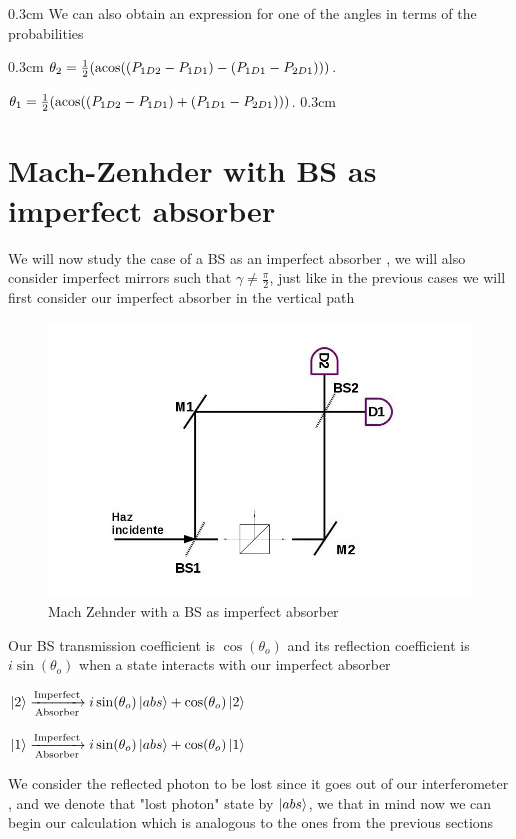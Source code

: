 \documentclass[11pt]{article}
\begin{document}
\vspace
{0.3cm}
We can also obtain an expression for one of the angles in terms of the probabilities

\vspace
{0.3cm}
$\theta_{2}=\frac{1}{2}(\acos((P_{1D2}-P_{1D1})-(P_{1D1}-P_{2D1})))$.

$\theta_{1}=\frac{1}{2}(\acos((P_{1D2}-P_{1D1})+(P_{1D1}-P_{2D1})))$.
\vspace
{0.3cm}

\section{Mach-Zenhder with BS as imperfect absorber}

We will now study the case of a BS as an imperfect absorber , we will also consider imperfect mirrors such that $\gamma \neq \frac{\pi}{2}$, just like in the previous cases we will first consider our imperfect absorber in the vertical path

\begin{figure}[h!]
\centering
\includegraphics[width=\linewidth,height=6.5 cm]{machzenhderbs.jpg}
\caption{Mach Zehnder with a BS as imperfect absorber}
\label{fig:BS2}
\end{figure}

\vspace{10 cm}

Our BS transmission coefficient is $\cos(\theta_{o})$ and its reflection coefficient is $i\sin(\theta_{o})$ when a state interacts with our imperfect absorber 

$\ket{2}\xrightarrow[\text{Absorber}]{\text{Imperfect}}i\sin(\theta_{o}) \ket{abs} +\cos(\theta_{o}) \ket{2} $

$\ket{1}\xrightarrow[\text{Absorber}]{\text{Imperfect}}i\sin(\theta_{o}) \ket{abs} +\cos(\theta_{o}) \ket{1} $

We consider the reflected photon to be lost since it goes out of our interferometer , and we denote that "lost photon" state by $\ket{abs}$, we that in mind now we can begin our calculation which is analogous to the ones from the previous sections
\end{document}
